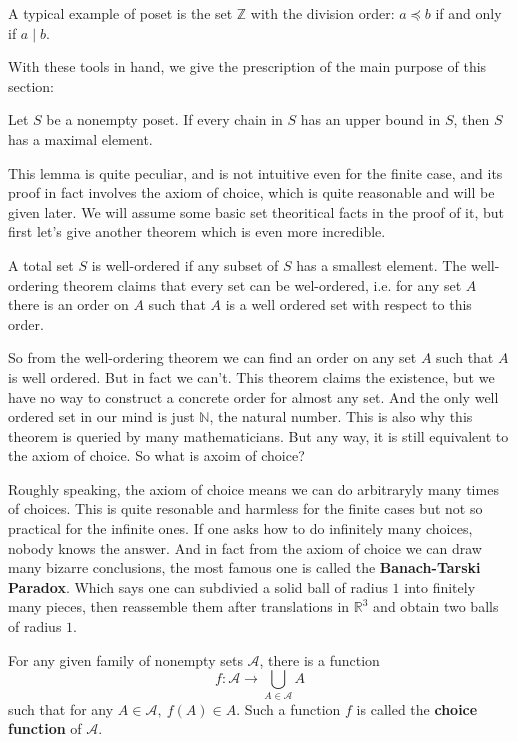 A typical example of poset is the set $\mathbb{Z}$ with the division order: $a\preceq b$ if and only if $a\mid b$.\par
With these tools in hand, we give the prescription of the main purpose of this section:
\begin{theorem}
Let $S$ be a nonempty poset. If every chain in $S$ has an upper bound in $S$, then $S$ has a maximal element.
\end{theorem}
This lemma is quite peculiar, and is not intuitive even for the finite case, and its proof in fact involves the axiom of choice, which is quite reasonable and will be given later. We will assume some basic set theoritical facts in the proof of it, but first let's give another theorem which is even more incredible.
\begin{theorem}
A total set  $S$ is well-ordered if any subset of $S$ has a smallest element. The well-ordering theorem claims that every set can be wel-ordered, i.e. for any set $A$ there is an order on $A$ such that $A$ is a 
well ordered set with respect to this order.
\end{theorem}
So from the well-ordering theorem we can find an order on any set $A$ such that $A$ is well ordered. But in fact we can't. This theorem claims the existence, but we have no way to construct a concrete order for almost any set. And the only well ordered set in our mind is just $\mathbb{N}$, the natural number. This is also why this theorem is queried by many mathematicians. But any way, it is still equivalent to the axiom of choice. So what is axoim of choice?\par
Roughly speaking, the axiom of choice means we can do arbitraryly many times of choices. This is quite resonable and harmless for the finite cases but not so practical for the infinite ones. If one asks how to do infinitely many choices, nobody knows the answer. And in fact from the axiom of choice we can draw many bizarre conclusions, the most famous one is called the \textbf{Banach-Tarski Paradox}. Which says one can subdivied a solid ball of radius $1$ into finitely many pieces, then reassemble them after translations in $\mathbb{R}^3$ and obtain two balls of radius $1$.
\begin{theorem}
For any given  family of nonempty sets $\mathscr{A}$, there is a function 
\[f:\mathscr{A}\to \bigcup_{A\in\mathscr{A}}A\] 
such that for any $A\in\mathscr{A},\ f(A)\in A$. Such a function $f$ is called the \textbf{choice function} of $\mathscr{A}$.
\end{theorem}
